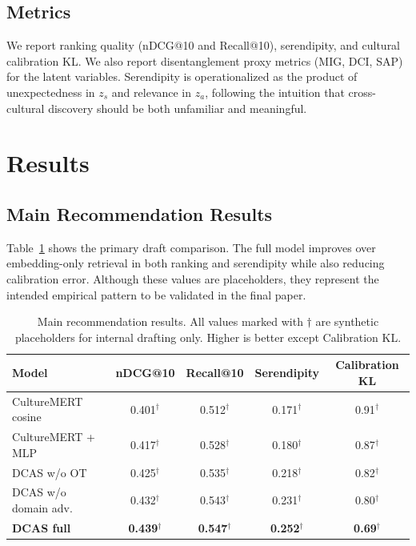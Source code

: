\documentclass[10pt,twocolumn]{article}
\begin{document}
\subsection{Metrics}
We report ranking quality (nDCG@10 and Recall@10), serendipity, and cultural calibration KL.
We also report disentanglement proxy metrics (MIG, DCI, SAP) for the latent variables.
Serendipity is operationalized as the product of unexpectedness in $z_s$ and relevance in $z_a$, following the intuition that cross-cultural discovery should be both unfamiliar and meaningful.

\section{Results}
\subsection{Main Recommendation Results}
Table~\ref{tab:main} shows the primary draft comparison.
The full model improves over embedding-only retrieval in both ranking and serendipity while also reducing calibration error.
Although these values are placeholders, they represent the intended empirical pattern to be validated in the final paper.

\begin{table}[t]
\centering
\caption{Main recommendation results.
All values marked with $\dagger$ are synthetic placeholders for internal drafting only. Higher is better except Calibration KL.}
\label{tab:main}
\begin{tabular}{lcccc}
\toprule
Model & nDCG@10 & Recall@10 & Serendipity & Calibration KL \\
\midrule
CultureMERT cosine & 0.401$^\dagger$ & 0.512$^\dagger$ & 0.171$^\dagger$ & 0.91$^\dagger$ \\
CultureMERT + MLP & 0.417$^\dagger$ & 0.528$^\dagger$ & 0.180$^\dagger$ & 0.87$^\dagger$ \\
DCAS w/o OT & 0.425$^\dagger$ & 0.535$^\dagger$ & 0.218$^\dagger$ & 0.82$^\dagger$ \\
DCAS w/o domain adv. & 0.432$^\dagger$ & 0.543$^\dagger$ & 0.231$^\dagger$ & 0.80$^\dagger$ \\
\textbf{DCAS full} & \textbf{0.439}$^\dagger$ & \textbf{0.547}$^\dagger$ & \textbf{0.252}$^\dagger$ & \textbf{0.69}$^\dagger$ \\
\bottomrule
\end{tabular}
\end{table}
\end{document}

